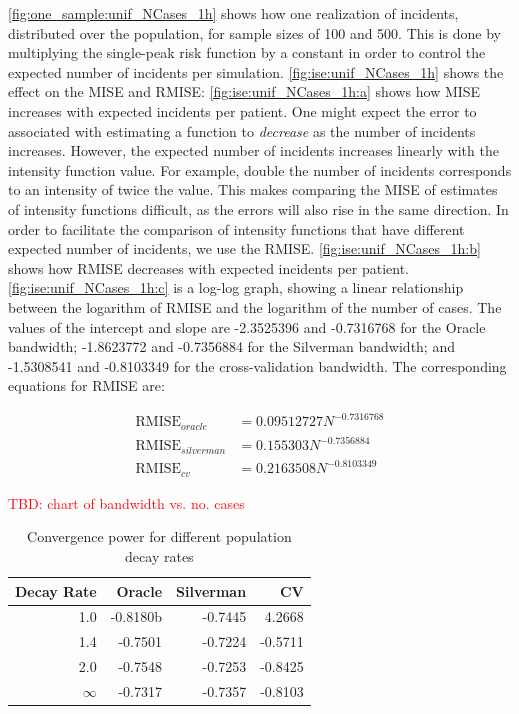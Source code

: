 \autoref{fig:one_sample:unif_NCases_1h} shows how one realization of incidents, distributed over the population, for sample sizes of 100 and 500.
This is done by multiplying the single-peak risk function by a constant in order to control the expected number of incidents per simulation.
\autoref{fig:ise:unif_NCases_1h} shows the effect on the MISE and RMISE:
\autoref{fig:ise:unif_NCases_1h:a} shows how MISE increases with expected incidents per patient.
One might expect the error to associated with estimating a function to \textit{decrease} as the number of incidents increases.
However, the expected number of incidents increases linearly with the intensity function value.
For example, double the number of incidents corresponds to an intensity of twice the value.
This makes comparing the MISE of estimates of intensity functions difficult, as the errors will also rise in the same direction.
In order to facilitate the comparison of intensity functions that have different expected number of incidents, we use the RMISE.
\autoref{fig:ise:unif_NCases_1h:b} shows how RMISE decreases with expected incidents per patient.
\autoref{fig:ise:unif_NCases_1h:c} is a log-log graph, showing a linear relationship between the logarithm of RMISE and the logarithm of the number of cases.
The values of the intercept and slope are -2.3525396 and -0.7316768 for the Oracle bandwidth; -1.8623772 and -0.7356884 for the Silverman bandwidth; and -1.5308541 and -0.8103349 for the cross-validation bandwidth.
The corresponding equations for RMISE are:

\begin{align}
    \mbox{RMISE}_{oracle} &= 0.09512727 N^{-0.7316768} \\
    \mbox{RMISE}_{silverman} &= 0.155303 N^{-0.7356884} \\
    \mbox{RMISE}_{cv} &= 0.2163508 N^{-0.8103349}
\end{align}

\textcolor{red}{TBD: chart of bandwidth vs. no. cases}

\begin{table}
\centering
\begin{tabular}{rrrr}
    \hline
    Decay Rate & Oracle & Silverman & CV \\ 
    \hline
    1.0 & -0.8180b & -0.7445 & 4.2668 \\
    1.4 & -0.7501 & -0.7224 & -0.5711 \\
    2.0 & -0.7548 & -0.7253 & -0.8425 \\
    \( \infty \) & -0.7317 & -0.7357 & -0.8103
\end{tabular}
\caption{Convergence power for different population decay rates}
\label{tab:convergence_vs_decay}
\end{table}

